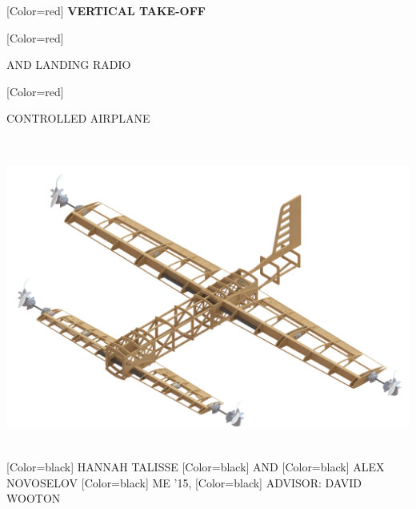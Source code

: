 \documentclass{article}
\begin{document}
\begin{minipage}[c]{20in}
{ 
[Color=red]
\fontsize{2.2in}{0.5in}\selectfont 
\bfseries
VERTICAL TAKE-OFF 
}
{ 
[Color=red]
\fontsize{2.02in}{0.5in}\selectfont 
\bfseries

\vspace{-0.1in}

AND LANDING RADIO
}
{ 
[Color=red]
\fontsize{1.8in}{0.5in}\selectfont 
\bfseries

\vspace{0.3in}

CONTROLLED AIRPLANE
}
\end{minipage}
\vspace{1in}\\
\begin{minipage}{21in}
\centering
\includegraphics[width=14in]{figure.png}
\end{minipage}
\vspace{1in}\\
{
[Color=black]
\fontsize{1in}{1em}\selectfont 
HANNAH TALISSE 
}
{
[Color=black]
\fontsize{0.8in}{1em}\selectfont 
AND
}
{
[Color=black]
\fontsize{1in}{1em}\selectfont 
ALEX NOVOSELOV
}
{
[Color=black]
\fontsize{0.8in}{1em}\selectfont 
ME '15,
}
% 
% 
{
[Color=black]
\fontsize{0.8in}{1em}\selectfont 
\noindent ADVISOR: DAVID WOOTON
}
\vspace{0.8in}\\
\end{document}
